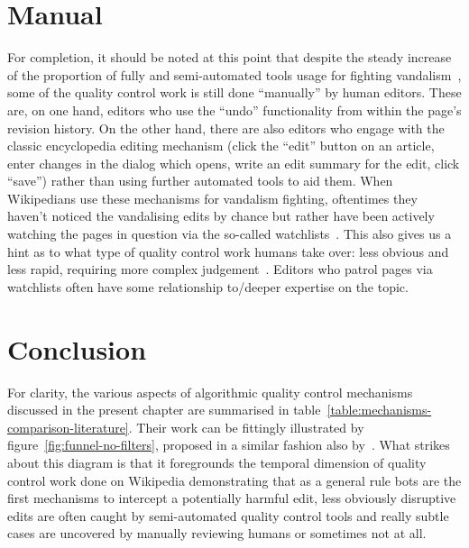 \section{Manual}

For completion, it should be noted at this point that despite the steady increase of the proportion of fully and semi-automated tools usage for fighting vandalism~\cite{Geiger2009}, some of the quality control work is still done ``manually'' by human editors.
These are, on one hand, editors who use the ``undo'' functionality from within the page's revision history.
On the other hand, there are also editors who engage with the classic encyclopedia editing mechanism (click the ``edit'' button on an article, enter changes in the dialog which opens, write an edit summary for the edit, click ``save'') rather than using further automated tools to aid them.
When Wikipedians use these mechanisms for vandalism fighting, oftentimes they haven't noticed the vandalising edits by chance but rather have been actively watching the pages in question via the so-called watchlists~\cite{AstHal2018}.
This also gives us a hint as to what type of quality control work humans take over: less obvious and less rapid, requiring more complex judgement~\cite{AstHal2018}.
Editors who patrol pages via watchlists often have some relationship to/deeper expertise on the topic.

\section{Conclusion}

For clarity, the various aspects of algorithmic quality control mechanisms discussed in the present chapter are summarised in table~\ref{table:mechanisms-comparison-literature}.
Their work can be fittingly illustrated by figure~\ref{fig:funnel-no-filters}, proposed in a similar fashion also by~\cite{AstHal2018}.
What strikes about this diagram is that it foregrounds the temporal dimension of quality control work done on Wikipedia demonstrating that as a general rule bots are the first mechanisms to intercept a potentially harmful edit, less obviously disruptive edits are often caught by semi-automated quality control tools and really subtle cases are uncovered by manually reviewing humans or sometimes not at all.

